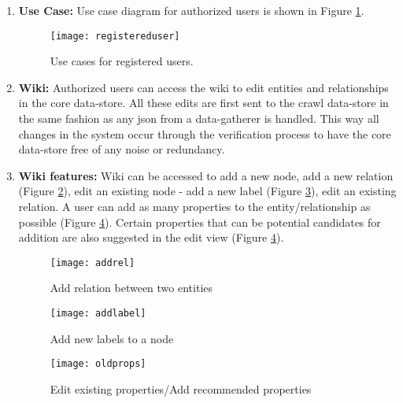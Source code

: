 \begin{enumerate}

\item \textbf{Use Case:} Use case diagram for authorized users is shown in Figure \ref{fig:registereduser}.

\begin{figure}[H]
\begin{center}  
\texttt{[image: registereduser]} 
\caption{Use cases for registered users.}
\label{fig:registereduser}
\end{center}
\end{figure}

\item \textbf{Wiki:} Authorized users can access the wiki to edit entities and relationships in the core data-store. All these edits are first sent to the crawl data-store in the same fashion as any json from a data-gatherer is handled. This way all changes in the system occur through the verification process to have the core data-store free of any noise or redundancy. 


\item \textbf{Wiki features:} Wiki can be accessed to add a new node, add a  new relation (Figure \ref{fig:addrel}),  edit an existing node  - add a new label (Figure \ref{fig:addlabel}), edit an existing relation. A user can add as many properties to the entity/relationship as possible (Figure \ref{fig:oldprops}). Certain properties that can be potential candidates for addition are also suggested in the edit view (Figure \ref{fig:oldprops}). 

\begin{figure}[H]
\begin{center}  
\texttt{[image: addrel]} 
\caption{Add relation between two entities}
\label{fig:addrel}
\end{center}
\end{figure}


\begin{figure}[H]
\begin{center}  
\texttt{[image: addlabel]} 
\caption{Add new labels to a node}
\label{fig:addlabel}
\end{center}
\end{figure}

\begin{figure}[H]
\begin{center}  
\texttt{[image: oldprops]} 
\caption{Edit existing properties/Add recommended properties}
\label{fig:oldprops}
\end{center}
\end{figure}



\end{enumerate}


